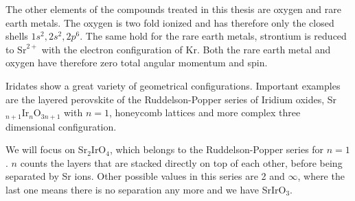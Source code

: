
The other elements of the compounds treated in this thesis are oxygen and rare earth metals. 
The oxygen is two fold ionized and has therefore only the closed shells $1s^2,2s^2,2p^6$.
The same hold for the rare earth metals, strontium is reduced to 
$\mathrm{Sr}^{2+}$ with the electron configuration of $\mathrm{Kr}$. 
Both the rare earth metal and oxygen have therefore zero total angular momentum and spin. 

Iridates show a great variety of geometrical configurations.
Important examples are the layered perovskite of the Ruddelson-Popper series of Iridium oxides, Sr$_{n+1}$Ir$_{n}$O$_{3n+1}$ with $n =1$,
honeycomb lattices and more complex three dimensional configuration.


We will focus on Sr$_2$IrO$_4$, which  belongs to the Ruddelson-Popper series for $n=1$.
$n$ counts the layers that are stacked directly on top of each other, 
before being separated by Sr ions. 
Other possible values in this series are 2 and $\infty$, where the last one means there is no separation any more and we have SrIrO$_3$. 

